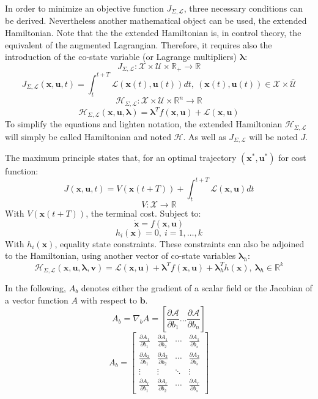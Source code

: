 \documentclass[a4paper, 12pt]{report}
\begin{document}
In order to minimize an objective function  $J_{\Sigma,\mathcal{L}}$, three necessary conditions can be derived. Nevertheless another mathematical object can be used, the extended Hamiltonian. Note that the the extended Hamiltonian is, in control theory, the equivalent of the augmented Lagrangian. Therefore, it requires also the introduction of the co-state variable (or Lagrange multipliers) $\boldsymbol{\lambda}$:
\[ J_{\Sigma,\mathcal{L}}: \mathcal{X} \times \mathcal{U} \times \mathbb{R_+} \rightarrow \mathbb{R} \]
\[ J_{\Sigma,\mathcal{L}}(\boldsymbol{x}, \boldsymbol{u}, t) = \int_{t}^{t+T} \mathcal{L}(\boldsymbol{x}(t), \boldsymbol{u}(t))dt, \ (\boldsymbol{x}(t), \boldsymbol{u}(t)) \in  \mathcal{X} \times \bar{\mathcal{U}}\]
\[ \mathcal{H}_{\Sigma,\mathcal{L}}: \mathcal{X} \times \mathcal{U} \times \mathbb{R}^n \rightarrow \mathbb{R} \]
\[ \mathcal{H}_{\Sigma,\mathcal{L}}(\boldsymbol{x}, \boldsymbol{u}, \boldsymbol{\lambda}) = \boldsymbol{\lambda}^Tf(\boldsymbol{x}, \boldsymbol{u}) + \mathcal{L}(\boldsymbol{x}, \boldsymbol{u}) \]
To simplify the equations and lighten notation, the extended Hamiltonian $\mathcal{H}_{\Sigma,\mathcal{L}}$ will simply be called Hamiltonian and noted $\mathcal{H}$. As well as $J_{\Sigma,\mathcal{L}}$ will be noted $J$.

The maximum principle states that, for an optimal trajectory $(\boldsymbol{x}^*, \boldsymbol{u}^*)$ for cost function:
\[ J(\boldsymbol{x}, \boldsymbol{u}, t) = V(\boldsymbol{x}(t+T))  + \int_t^{t+T} \mathcal{L}(\boldsymbol{x}, \boldsymbol{u})dt\]
\[ V: \mathcal{X} \rightarrow \mathbb{R} \]
With $ V(\boldsymbol{x}(t+T))$, the terminal cost. Subject to:
\[ \boldsymbol{\dot x} = f(\boldsymbol{x}, \boldsymbol{u}) \]
\[ h_i(\boldsymbol{x}) = 0,\ i = 1, \ldots, k \]
With $h_i(\boldsymbol{x})$, equality state constraints. These constraints can also be adjoined to the Hamiltonian, using another vector of co-state variables $\boldsymbol{\lambda}_h$:
\[ \mathcal{H}_{\Sigma,\mathcal{L}}(\boldsymbol{x}, \boldsymbol{u}, \boldsymbol{\lambda}, \boldsymbol{v}) = \mathcal{L}(\boldsymbol{x}, \boldsymbol{u}) + \boldsymbol{\lambda}^T f(\boldsymbol{x}, \boldsymbol{u}) + \boldsymbol{\lambda}_h^Th(\boldsymbol{x}),\ \boldsymbol{\lambda}_h \in \mathbb{R}^k \]

In the following, $A_b$ denotes either the gradient of a scalar field or the Jacobian of a vector function $A$ with respect to $\boldsymbol{b}$.
\[ A_b = \nabla_b A = \left [ \frac{\partial \mathcal{A}}{\partial b_1} \ldots \frac{\partial \mathcal{A}}{\partial b_n} \right ] \]
\[ A_b =  \begin{bmatrix} \frac{\partial A_1}{\partial b_1} & \frac{\partial A_1}{\partial b_2} & \cdots & \frac{\partial A_1}{\partial b_s}  \\ 
 \frac{\partial A_2}{\partial b_1} &  \frac{\partial A_2}{\partial b_2} & \cdots & \frac{\partial A_2}{\partial b_s}  \\ 
 \vdots &  \vdots & \ddots & \vdots  \\ 
 \frac{\partial A_r}{\partial b_1} &  \frac{\partial A_r}{\partial b_2} & \cdots & \frac{\partial A_r}{\partial b_s} \end{bmatrix}  \]
 
\end{document}
